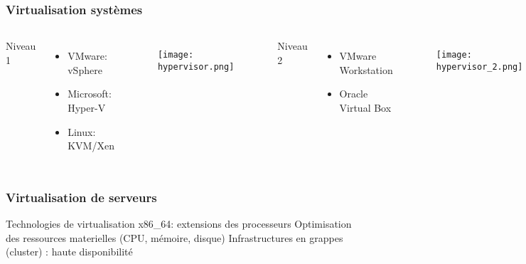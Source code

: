 \documentclass{beamer}
\begin{document}
\begin{frame}
\frametitle{Virtualisation systèmes}
\begin{columns}

Niveau 1
\begin{itemize}
    \item VMware: vSphere
    \item Microsoft: Hyper-V
    \item Linux: KVM/Xen
\end{itemize}

\begin{figure}[htbp]
    \centering
    \texttt{[image: hypervisor.png]}
    \label{fig:univerise}
\end{figure}

Niveau 2
\begin{itemize}
    \item VMware Workstation
    \item Oracle Virtual Box
\end{itemize}

\begin{figure}[htbp]
    \centering
    \texttt{[image: hypervisor\_2.png]}
\end{figure}


\end{columns}
\end{frame}
    

\begin{frame}
\frametitle{Virtualisation de serveurs}

Technologies de virtualisation x86\_64: extensions des processeurs
\medbreak
\medbreak
Optimisation des ressources materielles (CPU, mémoire, disque)
\medbreak
\medbreak
Infrastructures en grappes (cluster) : haute disponibilité %

\end{frame}

\end{document}
